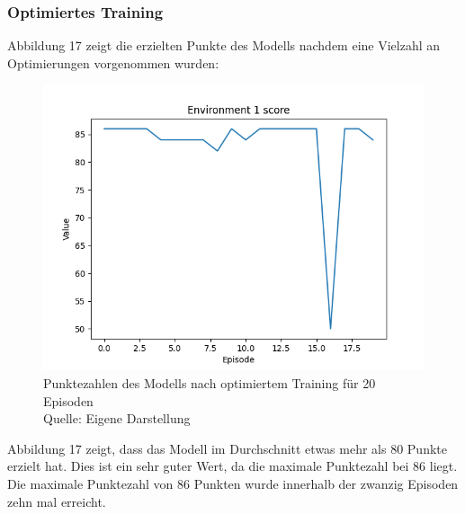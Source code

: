 \subsubsection{Optimiertes Training}
Abbildung 17 zeigt die erzielten Punkte des Modells nachdem eine Vielzahl an Optimierungen vorgenommen wurden:
\nopagebreak
\begin{figure}[H]
	\includegraphics[width=1\textwidth]{Bilder/optimizetraining} 
	\caption[Punktezahlen des Modells nach optimiertem Training für 20 Episoden]{Punktezahlen des Modells nach optimiertem Training für 20 Episoden\\ Quelle: Eigene Darstellung}
\end{figure}

Abbildung 17 zeigt, dass das Modell im Durchschnitt etwas mehr als 80 Punkte erzielt hat. Dies ist ein sehr guter Wert, da die maximale Punktezahl bei 86 liegt. Die maximale Punktezahl von 86 Punkten wurde innerhalb der zwanzig Episoden zehn mal erreicht.
